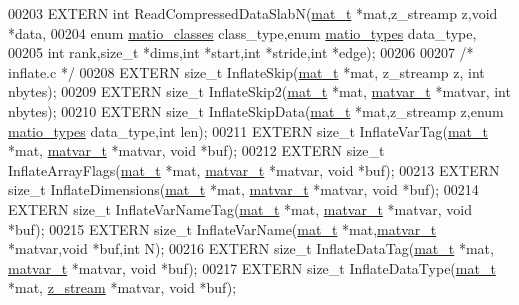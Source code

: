 \begin{DoxyCode}
00203 EXTERN \textcolor{keywordtype}{int} ReadCompressedDataSlabN(\hyperlink{struct__mat__t}{mat\_t} *mat,z\_streamp z,\textcolor{keywordtype}{void} *data,
00204                \textcolor{keyword}{enum} \hyperlink{group___m_a_t_gad4d60ae7b709fc81bfd744fb4c857c40}{matio\_classes} class\_type,\textcolor{keyword}{enum} \hyperlink{group___m_a_t_gacf7b3b879282b7ab3a51190e49bf3453}{matio\_types} data\_type,
00205                \textcolor{keywordtype}{int} rank,\textcolor{keywordtype}{size\_t} *dims,\textcolor{keywordtype}{int} *start,\textcolor{keywordtype}{int} *stride,\textcolor{keywordtype}{int} *edge);
00206 
00207 \textcolor{comment}{/* inflate.c */}
00208 EXTERN \textcolor{keywordtype}{size\_t} InflateSkip(\hyperlink{struct__mat__t}{mat\_t} *mat, z\_streamp z, \textcolor{keywordtype}{int} nbytes);
00209 EXTERN \textcolor{keywordtype}{size\_t} InflateSkip2(\hyperlink{struct__mat__t}{mat\_t} *mat, \hyperlink{group___m_a_t_structmatvar__t}{matvar\_t} *matvar, \textcolor{keywordtype}{int} nbytes);
00210 EXTERN \textcolor{keywordtype}{size\_t} InflateSkipData(\hyperlink{struct__mat__t}{mat\_t} *mat,z\_streamp z,\textcolor{keyword}{enum} \hyperlink{group___m_a_t_gacf7b3b879282b7ab3a51190e49bf3453}{matio\_types} data\_type,\textcolor{keywordtype}{int} len);
00211 EXTERN \textcolor{keywordtype}{size\_t} InflateVarTag(\hyperlink{struct__mat__t}{mat\_t} *mat, \hyperlink{group___m_a_t_structmatvar__t}{matvar\_t} *matvar, \textcolor{keywordtype}{void} *buf);
00212 EXTERN \textcolor{keywordtype}{size\_t} InflateArrayFlags(\hyperlink{struct__mat__t}{mat\_t} *mat, \hyperlink{group___m_a_t_structmatvar__t}{matvar\_t} *matvar, \textcolor{keywordtype}{void} *buf);
00213 EXTERN \textcolor{keywordtype}{size\_t} InflateDimensions(\hyperlink{struct__mat__t}{mat\_t} *mat, \hyperlink{group___m_a_t_structmatvar__t}{matvar\_t} *matvar, \textcolor{keywordtype}{void} *buf);
00214 EXTERN \textcolor{keywordtype}{size\_t} InflateVarNameTag(\hyperlink{struct__mat__t}{mat\_t} *mat, \hyperlink{group___m_a_t_structmatvar__t}{matvar\_t} *matvar, \textcolor{keywordtype}{void} *buf);
00215 EXTERN \textcolor{keywordtype}{size\_t} InflateVarName(\hyperlink{struct__mat__t}{mat\_t} *mat,\hyperlink{group___m_a_t_structmatvar__t}{matvar\_t} *matvar,\textcolor{keywordtype}{void} *buf,\textcolor{keywordtype}{int} N);
00216 EXTERN \textcolor{keywordtype}{size\_t} InflateDataTag(\hyperlink{struct__mat__t}{mat\_t} *mat, \hyperlink{group___m_a_t_structmatvar__t}{matvar\_t} *matvar, \textcolor{keywordtype}{void} *buf);
00217 EXTERN \textcolor{keywordtype}{size\_t} InflateDataType(\hyperlink{struct__mat__t}{mat\_t} *mat, \hyperlink{structz__stream__s}{z\_stream} *matvar, \textcolor{keywordtype}{void} *buf);

\end{DoxyCode}
